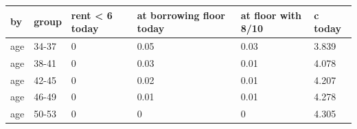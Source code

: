 \begingroup\small
\setlength{\tabcolsep}{3pt}
\renewcommand{\arraystretch}{1.04}
\begin{tabularx}{\linewidth}{XXXXXX}
\toprule
by & group & rent \textless{} 6 today & at borrowing floor today & at floor with 8/10 & c today \\
\midrule
age & 34-37 & 0 & 0.05 & 0.03 & 3.839 \\
age & 38-41 & 0 & 0.03 & 0.01 & 4.078 \\
age & 42-45 & 0 & 0.02 & 0.01 & 4.207 \\
age & 46-49 & 0 & 0.01 & 0.01 & 4.278 \\
age & 50-53 & 0 & 0 & 0 & 4.305 \\
\bottomrule
\end{tabularx}
\endgroup
